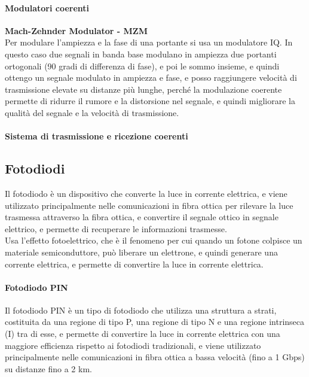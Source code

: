 \paragraph{Modulatori coerenti}

\textbf{Mach-Zehnder Modulator - MZM}\\
Per modulare l'ampiezza e la fase di una  portante si usa un modulatore IQ. In questo caso due segnali in banda base modulano in ampiezza due portanti ortogonali (90 gradi di differenza di fase), e poi le sommo insieme, e quindi ottengo un segnale modulato in ampiezza e fase, e posso raggiungere velocità di trasmissione elevate su distanze più lunghe, perché la modulazione coerente permette di ridurre il rumore e la distorsione nel segnale, e quindi migliorare la qualità del segnale e la velocità di trasmissione.\\

\paragraph{Sistema di trasmissione e ricezione coerenti}

\subsection{Fotodiodi}
Il fotodiodo è un dispositivo che converte la luce in corrente elettrica, e viene utilizzato principalmente nelle comunicazioni in fibra ottica per rilevare la luce trasmessa attraverso la fibra ottica, e convertire il segnale ottico in segnale elettrico, e permette di recuperare le informazioni trasmesse.\\
Usa l'effetto fotoelettrico, che è il fenomeno per cui quando un fotone colpisce un materiale semiconduttore, può liberare un elettrone, e quindi generare una corrente elettrica, 
e permette di convertire la luce in corrente elettrica.\\

\paragraph{Fotodiodo PIN}
Il fotodiodo PIN è un tipo di fotodiodo che utilizza una struttura a strati, costituita da una regione di tipo P, una regione di tipo N e una regione intrinseca (I) tra di esse,
e permette di convertire la luce in corrente elettrica con una maggiore efficienza rispetto ai fotodiodi tradizionali, e viene utilizzato principalmente nelle comunicazioni in fibra
ottica a bassa velocità (fino a 1 Gbps) su distanze fino a 2 km.\\

